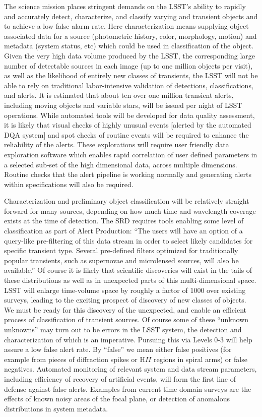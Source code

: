 \documentclass[SE,toc,lsstdraft]{lsstdoc}
\newcommand{\oldtext}[1]{{\color{red} #1}}
\newcommand{\newtext}[1]{{\color{blue} #1}}
\begin{document}
The science mission places stringent demands on the LSST's ability to rapidly and accurately detect, characterize, and classify varying and transient objects and to achieve a low false alarm rate.  Here characterization means supplying object associated data for a source (photometric history, color, morphology, motion) and metadata (system status, etc) which could be used in classification of the object.  Given the very high data volume  produced by the LSST, the corresponding large number of detectable sources in each  image (up to one million objects per visit), as well as the  likelihood of entirely new classes of transients, the LSST will not be able  to rely on traditional labor-intensive validation of detections,  classifications, and alerts.  It is estimated that \newtext{about ten} \oldtext{over one} million transient alerts, including moving objects and variable stars, will be issued per night of LSST operations. While automated tools will be developed for data quality assessment, it is likely that visual checks of highly unusual events \newtext{[alerted by the automated DQA system]} and spot checks of routine events will be required to enhance the reliability of the alerts.
\newtext{These explorations will require user friendly data exploration software which enables rapid correlation of user defined parameters in a selected sub-set of the high dimensional data, across multiple dimensions.}
Routine checks that the alert pipeline is working normally and generating alerts within specifications will also be required.

Characterization and preliminary object classification will be relatively straight forward for many sources, depending on how much time and wavelength coverage exists at the time of detection. The SRD requires tools enabling some level of classification as part of Alert Production:  ``The users will have an option of a query-like pre-filtering of this data stream in order to select likely candidates for specific transient type. Several pre-defined filters optimized for traditionally popular transients, such as supernovae and microlensed sources, will also be available.''  Of course it is likely that scientific discoveries will exist in the tails of these distributions as well as in unexpected parts of this multi-dimensional space.  LSST will enlarge time-volume space by roughly a factor of 1000 over existing surveys, leading to the exciting prospect of discovery of new classes of objects.  We must be ready for this discovery of the unexpected, and enable an efficient process of classification of transient sources.  Of course some of these ``unknown unknowns'' may turn out to be errors in the LSST system, the detection and characterization of which is an imperative.  Pursuing this via Levels 0-3 will help assure a low false alert rate. By ``false'' we mean either false positives (for example from pieces of diffraction spikes or H$II$ regions in spiral arms) or false negatives. Automated monitoring of relevant system and data stream parameters, including efficiency of recovery of artificial events, will form the first line of defense against false alerts. Examples from current time domain surveys are the effects of known noisy areas of the focal plane, or detection of anomalous distributions in system metadata.
\end{document}
